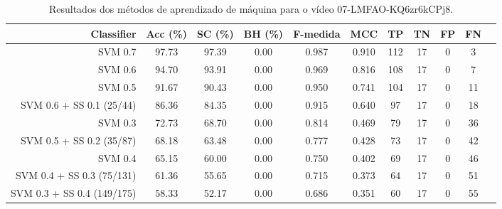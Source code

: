 \begin{table}[!htb]
\centering
\caption{Resultados dos métodos de aprendizado de máquina para o vídeo 07-LMFAO-KQ6zr6kCPj8.}
\label{tab:07-LMFAO-KQ6zr6kCPj8}
\begin{tabular}{r|c|c|c|c|c|c|c|c|c|c}
\hline\hline
Classifier & Acc (\%) & SC (\%) & BH (\%) & F-medida & MCC & TP & TN & FP & FN \\ \hline
SVM 0.7 & 97.73 & 97.39 & 0.00 & 0.987 & 0.910 & 112 & 17 & 0 & 3 \\ 
SVM 0.6 & 94.70 & 93.91 & 0.00 & 0.969 & 0.816 & 108 & 17 & 0 & 7 \\ 
SVM 0.5 & 91.67 & 90.43 & 0.00 & 0.950 & 0.741 & 104 & 17 & 0 & 11 \\ 
SVM 0.6 + SS 0.1 (25/44) & 86.36 & 84.35 & 0.00 & 0.915 & 0.640 & 97 & 17 & 0 & 18 \\ 
SVM 0.3 & 72.73 & 68.70 & 0.00 & 0.814 & 0.469 & 79 & 17 & 0 & 36 \\ 
SVM 0.5 + SS 0.2 (35/87) & 68.18 & 63.48 & 0.00 & 0.777 & 0.428 & 73 & 17 & 0 & 42 \\ 
SVM 0.4 & 65.15 & 60.00 & 0.00 & 0.750 & 0.402 & 69 & 17 & 0 & 46 \\ 
SVM 0.4 + SS 0.3 (75/131) & 61.36 & 55.65 & 0.00 & 0.715 & 0.373 & 64 & 17 & 0 & 51 \\ 
SVM 0.3 + SS 0.4 (149/175) & 58.33 & 52.17 & 0.00 & 0.686 & 0.351 & 60 & 17 & 0 & 55 \\ 
\hline\hline
\end{tabular}
\end{table}

